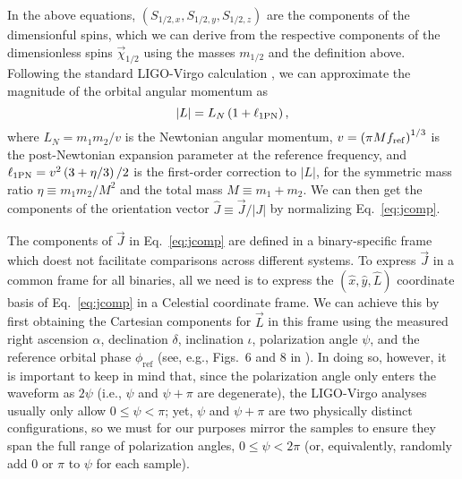 \documentclass[aps,prd,twocolumn,superscriptaddress,preprintnumbers,floatfix,nofootinbib]{revtex4-2}
\begin{document}
In the above equations, $(S_{1/2,x},S_{1/2,y},S_{1/2,z})$ are the components of the dimensionful spins, which we can derive from the respective components of the dimensionless spins $\vec{\chi}_{1/2}$ using the masses $m_{1/2}$ and the definition above. 
Following the standard LIGO-Virgo calculation \cite{LALSuite:spins}, we can approximate the magnitude of the orbital angular momentum as \cite{Kidder:1995zr,Bohe:2012mr}
\begin{equation}
|L| = L_N \left(1 + \ell_{\rm 1PN}\right),
\end{equation}
where $L_N = m_1 m_2 / v$ is the Newtonian angular momentum, $v = \left( \pi M f_{\rm ref} \right)^{1/3}$ is the post-Newtonian expansion parameter at the reference frequency, and $\ell_{\rm 1PN} = v^2 \left( 3 + \eta /3 \right)/2$ is the first-order correction to $|L|$, for the symmetric mass ratio $\eta \equiv m_1 m_2/M^2$ and the total mass $M \equiv m_1 + m_2$.
We can then get the components of the orientation vector $\hat{J} \equiv \vec{J} /|J|$ by normalizing Eq.~\eqref{eq:jcomp}.

The components of $\vec{J}$ in Eq.~\eqref{eq:jcomp} are defined in a binary-specific frame which doest not facilitate comparisons across different systems.
To express $\vec{J}$ in a common frame for all binaries, all we need is to express the $(\hat{x}, \hat{y}, \hat{L})$ coordinate basis of Eq.~\eqref{eq:jcomp} in a Celestial coordinate frame.
We can achieve this by first obtaining the Cartesian components for $\vec{L}$ in this frame using the measured right ascension $\alpha$, declination $\delta$, inclination $\iota$, polarization angle $\psi$, and the reference orbital phase $\phi_\mathrm{ref}$ (see, e.g., Figs.~6 and 8 in \cite{Isi:2022mbx}).
In doing so, however, it is important to keep in mind that, since the polarization angle only enters the waveform as $2\psi$ (i.e., $\psi$ and $\psi + \pi$ are degenerate), the LIGO-Virgo analyses usually only allow $0 \leq \psi < \pi$; yet, $\psi$ and $\psi + \pi$ are two physically distinct configurations, so we must for our purposes mirror the samples to ensure they span the full range of polarization angles, $0 \leq \psi < 2\pi$ (or, equivalently, randomly add $0$ or $\pi$ to $\psi$ for each sample).
\end{document}
